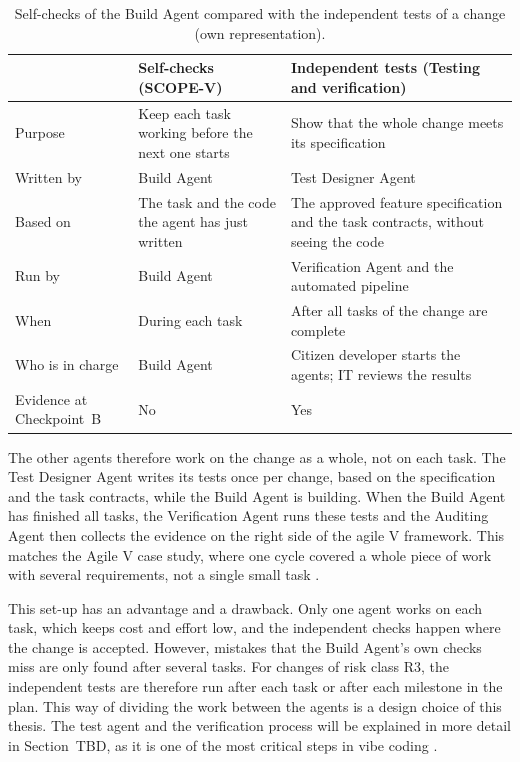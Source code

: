 \documentclass[10pt,a4paper]{article}
\begin{document}
\begin{table}[H]
    \centering
    \small
    \caption{Self-checks of the Build Agent compared with the independent
    tests of a change (own representation).}
    \label{tab:self-checks-vs-independent}
    \begin{tabular}{p{3.0cm} p{5.6cm} p{5.6cm}}
    \hline
    & \textbf{Self-checks (SCOPE-V)} & \textbf{Independent tests
        (Testing and verification)} \\
    \hline
    Purpose & Keep each task working before the next one starts & Show
        that the whole change meets its specification \\
    Written by & Build Agent & Test Designer Agent \\
    Based on & The task and the code the agent has just written & The
        approved feature specification and the task contracts, without
        seeing the code \\
    Run by & Build Agent & Verification Agent and the automated pipeline \\
    When & During each task & After all tasks of the change are complete \\
    Who is in charge & Build Agent & Citizen developer starts the agents;
        IT reviews the results \\
    Evidence at Checkpoint~B & No & Yes \\
    \hline
    \end{tabular}
\end{table}

The other agents therefore work on the change as a whole, not on each task. The Test Designer Agent writes its tests once per change, based on the specification and the task contracts, while the Build Agent is building. When the Build Agent has finished all tasks, the Verification Agent runs these tests and the Auditing Agent then collects the evidence on the right side of the agile V framework. This matches the Agile V case study, where one cycle covered a whole piece of work with several requirements, not a single small task \parencite{koch2026agile}.

This set-up has an advantage and a drawback. Only one agent works on each task, which keeps cost and effort low, and the independent checks happen where the change is accepted. However, mistakes that the Build Agent's own checks miss are only found after several tasks. For changes of risk class R3, the independent tests are therefore run after each task or after each milestone in the plan.
 This way of dividing the work between the agents is a design choice of this thesis. The test agent and the verification process will be explained in more detail in Section~TBD, as it is one of the most critical steps in vibe coding \parencite{bcgplatinion2026agentic}.
\end{document}
